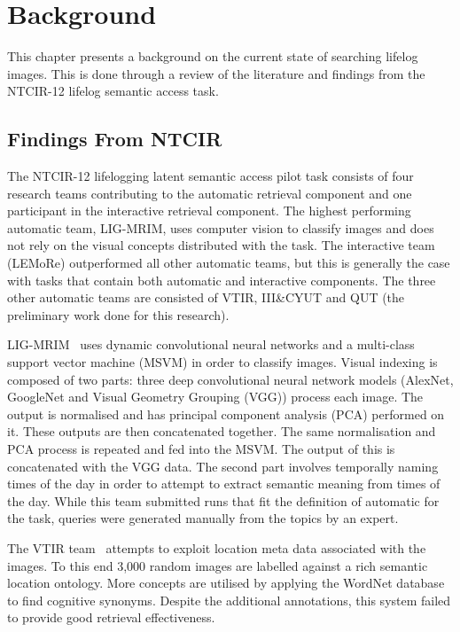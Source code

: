 \chapter{Background}

This chapter presents a background on the current state of searching lifelog images. This is done through a review of the literature and findings from the NTCIR-12 lifelog semantic access task. 



\section{Findings From NTCIR}
The NTCIR-12 lifelogging latent semantic access pilot task consists of four research teams contributing to the automatic retrieval component and one participant in the interactive retrieval component. The highest performing automatic team, LIG-MRIM, uses computer vision to classify images and does not rely on the visual concepts distributed with the task. The interactive team (LEMoRe) outperformed all other automatic teams, but this is generally the case with tasks that contain both automatic and interactive components. The three other automatic teams are consisted of VTIR, III\&CYUT and QUT (the preliminary work done for this research).

LIG-MRIM~\cite{safadilig2016ligmrim} uses dynamic convolutional neural networks and a multi-class support vector machine (MSVM) in order to classify images. Visual indexing is composed of two parts: three deep convolutional neural network models (AlexNet, GoogleNet and Visual Geometry Grouping (VGG)) process each image. The output is normalised and has principal component analysis (PCA) performed on it. These outputs are then concatenated together. The same normalisation and PCA process is repeated and fed into the MSVM. The output of this is concatenated with the VGG data. The second part involves temporally naming times of the day in order to attempt to extract semantic meaning from times of the day. While this team submitted runs that fit the definition of automatic for the task, queries were generated manually from the topics by an expert.

The VTIR team~\cite{xia2016vtir} attempts to exploit location meta data associated with the images. To this end 3,000 random images are labelled against a rich semantic location ontology. More concepts are utilised by applying the WordNet database to find cognitive synonyms. Despite the additional annotations, this system failed to provide good retrieval effectiveness.


